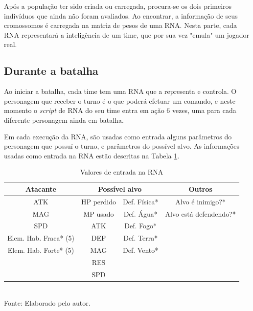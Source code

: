 \documentclass[
	12pt,					%
	openright,				%
	oneside,				%
	a4paper,				%
	bibjustif,				%
	chapter=TITLE,			%
	english,				%
	brazil,					%
	]{abntex2}
\newcommand{\source}[1]{\small Fonte: {#1}}
\begin{document}
	Após a população ter sido criada ou carregada,
	procura-se os dois primeiros indivíduos que ainda não foram avaliados.
	Ao encontrar, a informação de seus cromossomos é carregada na matriz de pesos de uma RNA.
	Nesta parte, cada RNA representará a inteligência de um time,
	que por sua vez "emula"{} um jogador real.
	
	\subsection{Durante a batalha} \label{ssec:duranteABatalha}
	Ao iniciar a batalha, cada time tem uma RNA que a representa e controla.
	O personagem que receber o turno é o que poderá efetuar um comando,
	e neste momento o \textit{script} de RNA do seu time entra em ação 6 vezes,
	uma para cada diferente personagem ainda em batalha.
	
	Em cada execução da RNA, são usadas como entrada alguns parâmetros do personagem que possuí o turno,
	e parâmetros do possível alvo.
	As informações usadas como entrada na RNA estão descritas na Tabela \ref{tab:nnInput}.
	
	\begin{table}[h]
		\caption{Valores de entrada na RNA}
		\centering
		\small
		\renewcommand{\arraystretch}{1.2} %
		\begin{tabular}{c|c|c|c}
			\hline 
			\textbf{Atacante}			& \multicolumn{2}{c|}{\textbf{Possível alvo}}	& \textbf{Outros}		\\\hline
			ATK							& HP perdido		& Def. Física*		& Alvo é inimigo?*				\\ 
			MAG							& MP usado			& Def. Água*		& Alvo está defendendo?*		\\ 
			SPD							& ATK				& Def. Fogo*		& 								\\ 
			Elem. Hab. Fraca* (5)		& DEF				& Def. Terra*		& 								\\ 
			Elem. Hab. Forte* (5)		& MAG				& Def. Vento*		& 								\\ 
										& RES									& 								\\
										& SPD									& 								\\\hline
		\end{tabular}\\
		\vspace{3mm}
		\source{Elaborado pelo autor.}
		\label{tab:nnInput}
	\end{table}
	
\end{document}
